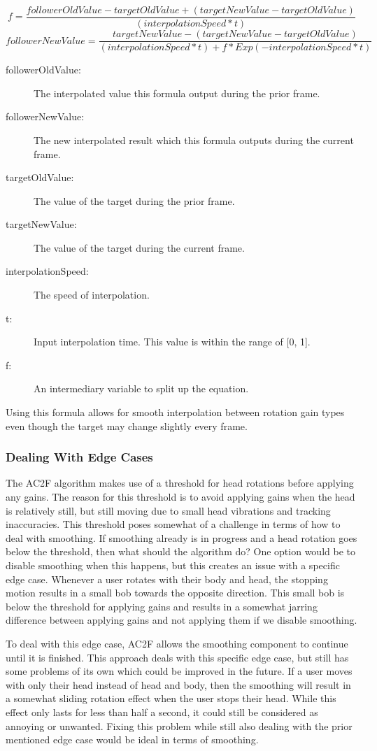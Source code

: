 $$
f = \frac{followerOldValue - targetOldValue + (targetNewValue - targetOldValue)}{(interpolationSpeed * t)}
$$
$$
followerNewValue = \frac{targetNewValue - (targetNewValue - targetOldValue)}{(interpolationSpeed * t) + f * Exp(-interpolationSpeed * t)}
$$
\begin{description}
    \item[followerOldValue:] The interpolated value this formula output during the prior frame.
    \item[followerNewValue:] The new interpolated result which this formula outputs during the current frame.
    \item[targetOldValue:] The value of the target during the prior frame. 
    \item[targetNewValue:] The value of the target during the current frame.
    \item[interpolationSpeed:] The speed of interpolation.
    \item[t:] Input interpolation time. This value is within the range of [0, 1]. 
    \item[f:] An intermediary variable to split up the equation.
\end{description}

Using this formula allows for smooth interpolation between rotation gain types even though the target may change slightly every frame. 

\subsubsection{Dealing With Edge Cases}
The AC2F algorithm makes use of a threshold for head rotations before applying any gains. The reason for this threshold is to avoid applying gains when the head is relatively still, but still moving due to small head vibrations and tracking inaccuracies. This threshold poses somewhat of a challenge in terms of how to deal with smoothing. If smoothing already is in progress and a head rotation goes below the threshold, then what should the algorithm do? One option would be to disable smoothing when this happens, but this creates an issue with a specific edge case. Whenever a user rotates with their body and head, the stopping motion results in a small bob towards the opposite direction. This small bob is below the threshold for applying gains and results in a somewhat jarring difference between applying gains and not applying them if we disable smoothing.

To deal with this edge case, AC2F allows the smoothing component to continue until it is finished. This approach deals with this specific edge case, but still has some problems of its own which could be improved in the future. If a user moves with only their head instead of head and body, then the smoothing will result in a somewhat sliding rotation effect when the user stops their head. While this effect only lasts for less than half a second, it could still be considered as annoying or unwanted. Fixing this problem while still also dealing with the prior mentioned edge case would be ideal in terms of smoothing. 

